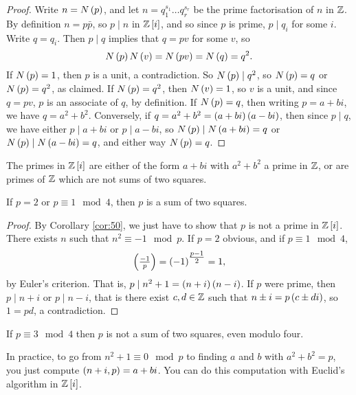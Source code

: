 \begin{proof}
Write $ n = N\br{p} $, and let $ n = q_1^{s_1} \dots q_r^{s_r} $ be the prime factorisation of $ n $ in $ \mathbb{Z} $. By definition $ n = p\bar{p} $, so $ p \mid n $ in $ \Z\sbr{i} $, and so since $ p $ is prime, $ p \mid q_i $ for some $ i $. Write $ q = q_i $. Then $ p \mid q $ implies that $ q = pv $ for some $ v $, so
$$ N\br{p}N\br{v} = N\br{pv} = N\br{q} = q^2. $$
If $ N\br{p} = 1 $, then $ p $ is a unit, a contradiction. So $ N\br{p} \mid q^2 $, so $ N\br{p} = q $ or $ N\br{p} = q^2 $, as claimed. If $ N\br{p} = q^2 $, then $ N\br{v} = 1 $, so $ v $ is a unit, and since $ q = pv $, $ p $ is an associate of $ q $, by definition. If $ N\br{p} = q $, then writing $ p = a + bi $, we have $ q = a^2 + b^2 $. Conversely, if $ q = a^2 + b^2 = \br{a + bi}\br{a - bi} $,
then since $ p \mid q $, we have either $ p \mid a + bi $ or $ p \mid a - bi $, so $ N\br{p} \mid N\br{a + bi} = q $ or $ N\br{p} \mid N\br{a - bi} = q $, and either way $ N\br{p} = q $.
\end{proof}

\pagebreak

\begin{corollary}
\label{cor:50}
The primes in $ \Z\sbr{i} $ are either of the form $ a + bi $ with $ a^2 + b^2 $ a prime in $ \mathbb{Z} $, or are primes of $ \mathbb{Z} $ which are not sums of two squares.
\end{corollary}

\begin{theorem}
If $ p = 2 $ or $ p \equiv 1 \mod 4 $, then $ p $ is a sum of two squares.
\end{theorem}

\begin{proof}
By Corollary \ref{cor:50}, we just have to show that $ p $ is not a prime in $ \Z\sbr{i} $. There exists $ n $ such that $ n^2 \equiv -1 \mod p $. If $ p = 2 $ obvious, and if $ p \equiv 1 \mod 4 $,
$$ \jacobi{-1}{p} = \br{-1}^{\tfrac{p - 1}{2}} = 1, $$
by Euler's criterion. That is, $ p \mid n^2 + 1 = \br{n + i}\br{n - i} $. If $ p $ were prime, then $ p \mid n + i $ or $ p \mid n - i $, that is there exist $ c, d \in \mathbb{Z} $ such that $ n \pm i = p\br{c \pm di} $, so $ 1 = pd $, a contradiction.
\end{proof}

\begin{remark*}
If $ p \equiv 3 \mod 4 $ then $ p $ is not a sum of two squares, even modulo four.
\end{remark*}

\begin{remark*}
In practice, to go from $ n^2 + 1 \equiv 0 \mod p $ to finding $ a $ and $ b $ with $ a^2 + b^2 = p $, you just compute $ \br{n + i, p} = a + bi $. You can do this computation with Euclid's algorithm in $ \Z\sbr{i} $.
\end{remark*}

